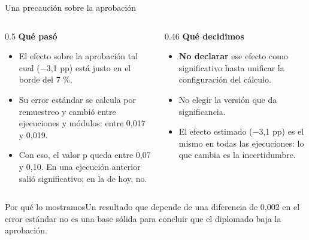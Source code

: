 \documentclass[10pt,aspectratio=169]{beamer}
\newcommand{\sintesis}[2]{%
  \begin{block}{#1}#2\end{block}}
\begin{document}
\begin{frame}{Una precaución sobre la aprobación}
  \begin{columns}[T]
    \begin{column}{0.5\textwidth}\small
      \textbf{Qué pasó}
      \begin{itemize}
        \item El efecto sobre la aprobación tal cual ($-$3,1 pp) está justo en el borde del 7 \%.
        \item Su error estándar se calcula por remuestreo y cambió entre ejecuciones y módulos: entre 0,017 y 0,019.
        \item Con eso, el valor p queda entre 0,07 y 0,10. En una ejecución anterior salió significativo; en la de hoy, no.
      \end{itemize}
    \end{column}
    \begin{column}{0.46\textwidth}\small
      \textbf{Qué decidimos}
      \begin{itemize}
        \item \textbf{No declarar} ese efecto como significativo hasta unificar la configuración del cálculo.
        \item No elegir la versión que da significancia.
        \item El efecto estimado ($-$3,1 pp) es el mismo en todas las ejecuciones: lo que cambia es la incertidumbre.
      \end{itemize}
    \end{column}
  \end{columns}
  \vspace{0.6em}
  \sintesis{Por qué lo mostramos}{Un resultado que depende de una diferencia de 0,002 en el error estándar no es una base sólida para concluir que el diplomado baja la aprobación.}
\end{frame}
\end{document}
